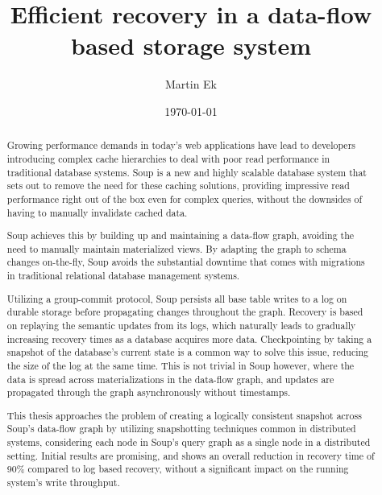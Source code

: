 \documentclass[b5paper]{report}
\begin{document}
\title{Efficient recovery in a data-flow based storage system}
\author{Martin Ek}
\date{\today}
\maketitle



\begin{abstract}
  Growing performance demands in today's web applications have lead to developers
  introducing complex cache hierarchies to deal with poor read performance in
  traditional database systems. Soup is a new and highly scalable database system
  that sets out to remove the need for these caching solutions, providing
  impressive read performance right out of the box even for complex queries,
  without the downsides of having to manually invalidate cached data.

  Soup achieves this by building up and maintaining a data-flow graph, avoiding
  the need to manually maintain materialized views. By adapting the graph to
  schema changes on-the-fly, Soup avoids the substantial downtime that
  comes with migrations in traditional relational database management systems.

  Utilizing a group-commit protocol, Soup persists all base table writes to a
  log on durable storage before propagating changes throughout the graph.
  Recovery is based on replaying the semantic updates from its logs, which
  naturally leads to gradually increasing recovery times as a database acquires
  more data. Checkpointing by taking a snapshot of the database's current state
  is a common way to solve this issue, reducing the size of the log at the same
  time. This is not trivial in Soup however, where the data is spread across
  materializations in the data-flow graph, and updates are propagated through
  the graph asynchronously without timestamps.

  This thesis approaches the problem of creating a logically consistent snapshot
  across Soup's data-flow graph by utilizing snapshotting techniques common in
  distributed systems, considering each node in Soup's query graph as a single
  node in a distributed setting. Initial results are promising, and shows an
  overall reduction in recovery time of 90\% compared to log based recovery,
  without a significant impact on the running system's write throughput.
\end{abstract}

\tableofcontents
\pagebreak
\end{document}
